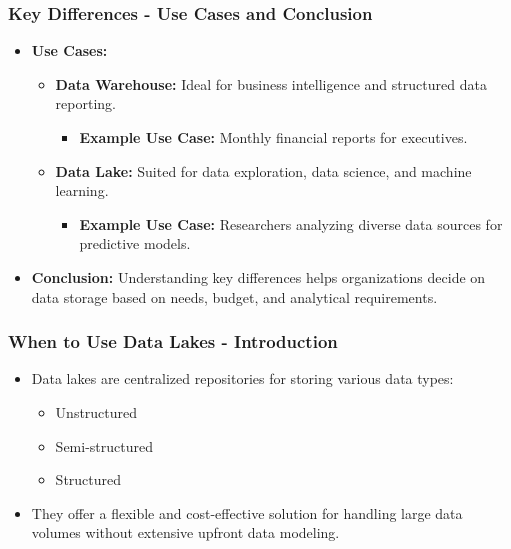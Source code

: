 \documentclass[aspectratio=169]{beamer}
\begin{document}
\begin{frame}[fragile]
    \frametitle{Key Differences - Use Cases and Conclusion}
    \begin{itemize}
        \item \textbf{Use Cases:}
        \begin{itemize}
            \item \textbf{Data Warehouse:} Ideal for business intelligence and structured data reporting.
            \begin{itemize}
                \item \textbf{Example Use Case:} Monthly financial reports for executives.
            \end{itemize}

            \item \textbf{Data Lake:} Suited for data exploration, data science, and machine learning.
            \begin{itemize}
                \item \textbf{Example Use Case:} Researchers analyzing diverse data sources for predictive models.
            \end{itemize}
        \end{itemize}
        
        \item \textbf{Conclusion:} Understanding key differences helps organizations decide on data storage based on needs, budget, and analytical requirements.
    \end{itemize}
\end{frame}

\begin{frame}[fragile]
    \frametitle{When to Use Data Lakes - Introduction}
    \begin{itemize}
        \item Data lakes are centralized repositories for storing various data types:
        \begin{itemize}
            \item Unstructured
            \item Semi-structured
            \item Structured
        \end{itemize}
        \item They offer a flexible and cost-effective solution for handling large data volumes without extensive upfront data modeling.
    \end{itemize}
\end{frame}
\end{document}
